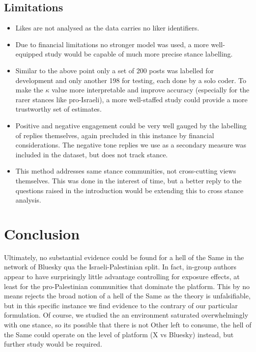 \documentclass[11pt]{article}   %
\begin{document}
\subsection{Limitations}\label{sec:limitations}
\begin{itemize}
    \item Likes are not analysed as the data carries no liker identifiers.
    \item Due to financial limitations no stronger model was used, a more well-equipped study would be capable of much more precise stance labelling.
    \item Similar to the above point only a set of 200 posts was labelled for development and only another 198 for testing, each done by a solo coder.
    To make the $\kappa$ value more interpretable and improve accuracy (especially for the rarer stances like pro-Israeli), a more well-staffed study could
    provide a more trustworthy set of estimates.
    \item Positive and negative engagement could be very well gauged by the labelling of replies themselves, again precluded in this instance by financial considerations. The negative tone replies we use as a secondary measure was included in the dataset, but does not track stance.
    \item This method addresses same stance communities, not cross-cutting views themselves. This was done in the interest of time, but a better reply to the questions raised in the introduction would be extending this to cross stance analysis. 
\end{itemize}

\section{Conclusion}\label{sec:conclusion}
Ultimately, no substantial evidence could be found for a hell of the Same in the network of Bluesky qua the Israeli-Palestinian split.
In fact, in-group authors appear to have surprisingly little advantage controlling for exposure effects, at least for the pro-Palestinian communities that dominate the platform. This by no means rejects the broad notion of a hell of the Same as the theory is unfalsifiable,
but in this specific instance we find evidence to the contrary of our particular formulation. Of course, we studied the an environment saturated overwhelmingly with one stance,
so its possible that there is not Other left to consume, the hell of the Same could operate on the level of platform (X vs Bluesky) instead, but further study would be required. \bigskip
\end{document}
